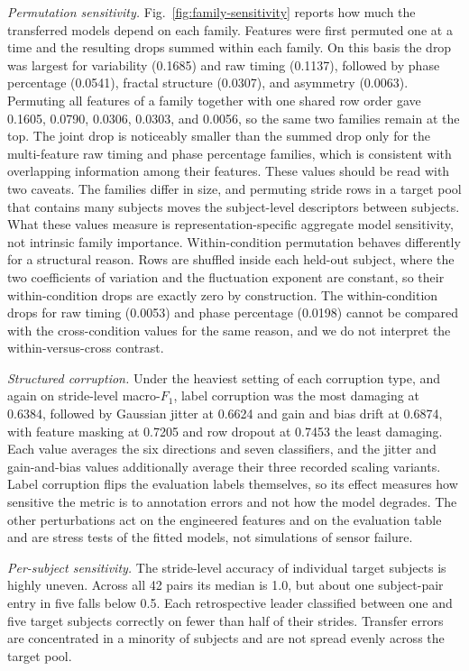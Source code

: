 \documentclass[conference]{IEEEtran}
\begin{document}
\textit{Permutation sensitivity.} Fig.~\ref{fig:family-sensitivity} reports how much the transferred models depend on each family. Features were first permuted one at a time and the resulting drops summed within each family. On this basis the drop was largest for variability (0.1685) and raw timing (0.1137), followed by phase percentage (0.0541), fractal structure (0.0307), and asymmetry (0.0063). Permuting all features of a family together with one shared row order gave 0.1605, 0.0790, 0.0306, 0.0303, and 0.0056, so the same two families remain at the top. The joint drop is noticeably smaller than the summed drop only for the multi-feature raw timing and phase percentage families, which is consistent with overlapping information among their features. These values should be read with two caveats. The families differ in size, and permuting stride rows in a target pool that contains many subjects moves the subject-level descriptors between subjects. What these values measure is representation-specific aggregate model sensitivity, not intrinsic family importance. Within-condition permutation behaves differently for a structural reason. Rows are shuffled inside each held-out subject, where the two coefficients of variation and the fluctuation exponent are constant, so their within-condition drops are exactly zero by construction. The within-condition drops for raw timing (0.0053) and phase percentage (0.0198) cannot be compared with the cross-condition values for the same reason, and we do not interpret the within-versus-cross contrast.

\textit{Structured corruption.} Under the heaviest setting of each corruption type, and again on stride-level macro-$F_1$, label corruption was the most damaging at 0.6384, followed by Gaussian jitter at 0.6624 and gain and bias drift at 0.6874, with feature masking at 0.7205 and row dropout at 0.7453 the least damaging. Each value averages the six directions and seven classifiers, and the jitter and gain-and-bias values additionally average their three recorded scaling variants. Label corruption flips the evaluation labels themselves, so its effect measures how sensitive the metric is to annotation errors and not how the model degrades. The other perturbations act on the engineered features and on the evaluation table and are stress tests of the fitted models, not simulations of sensor failure.

\textit{Per-subject sensitivity.} The stride-level accuracy of individual target subjects is highly uneven. Across all 42 pairs its median is 1.0, but about one subject-pair entry in five falls below 0.5. Each retrospective leader classified between one and five target subjects correctly on fewer than half of their strides. Transfer errors are concentrated in a minority of subjects and are not spread evenly across the target pool.
\end{document}

